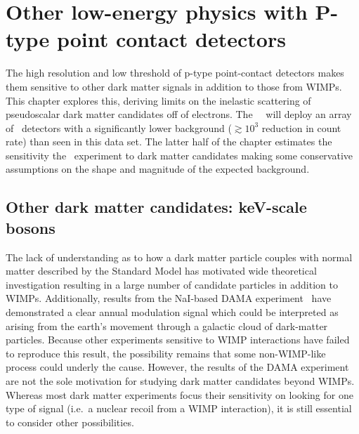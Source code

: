\chapter{Other low-energy physics with P-type point contact detectors}

	

	The high resolution and low threshold of p-type point-contact detectors makes them sensitive to other dark matter signals in addition to those from WIMPs.  This chapter explores this, deriving limits on the inelastic scattering of pseudoscalar dark matter candidates off of electrons.  The \MJ~\minmod~will deploy an array of \ppc~detectors with a significantly lower background ($\gtrsim10^{3}$ reduction in count rate) than seen in this data set.  The latter half of the chapter estimates the sensitivity the \MJ~experiment to dark matter candidates making some conservative assumptions on the shape and magnitude of the expected background.  
		
	\section{Other dark matter candidates: keV-scale bosons}
	\label{sec:CalcLimitsOnHeavyAxions}		

	The lack of understanding as to how a dark matter particle couples with normal matter described by the Standard Model has motivated wide theoretical investigation resulting in a large number of candidate particles in addition to WIMPs.  Additionally, results from the NaI-based DAMA experiment~\cite{Bernabei:2005ca} have demonstrated a clear annual modulation signal which could be interpreted as arising from the earth's movement through a galactic cloud of dark-matter particles.  Because other experiments sensitive to WIMP interactions have failed to reproduce this result, the possibility remains that some non-WIMP-like process could underly the cause.  However, the results of the DAMA experiment are not the sole motivation for studying dark matter candidates beyond WIMPs.  Whereas most dark matter experiments focus their sensitivity on looking for one type of signal (i.e.~a nuclear recoil from a WIMP interaction), it is still essential to consider other possibilities.  
	
